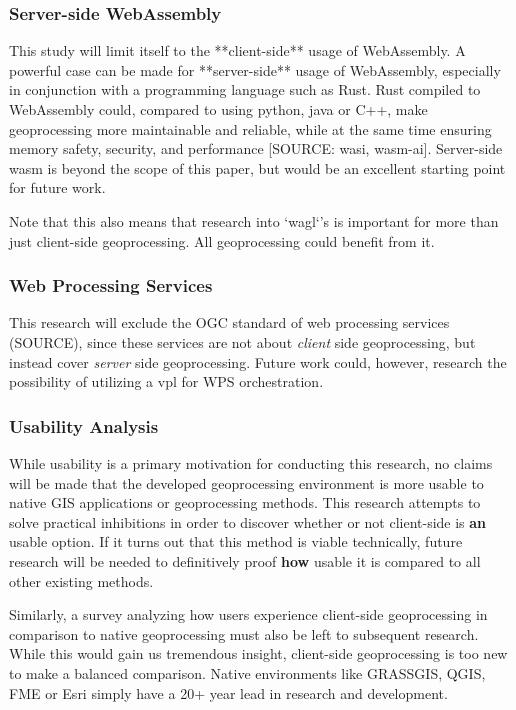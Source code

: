 \subsubsection*{Server-side WebAssembly} %

This study will limit itself to the **client-side** usage of WebAssembly. 
A powerful case can be made for **server-side** usage of WebAssembly, especially in conjunction with a programming language such as Rust. 
Rust compiled to WebAssembly could, compared to using python, java or C++, make geoprocessing more maintainable and reliable, while at the same time ensuring memory safety, security, and performance [SOURCE: wasi, wasm-ai]. 
Server-side wasm is beyond the scope of this paper, but would be an excellent starting point for future work. 

Note that this also means that research into `wagl`'s is important for more than just client-side geoprocessing. All geoprocessing could benefit from it.



\subsubsection*{Web Processing Services} %

This research will exclude the OGC standard of web processing services (SOURCE), since these services are not about \emph{client} side geoprocessing, but instead cover \emph{server} side geoprocessing. 
Future work could, however, research the possibility of utilizing a vpl for WPS orchestration. 



\subsubsection*{Usability Analysis} %

While usability is a primary motivation for conducting this research, no claims will be made that the developed geoprocessing environment is more usable to native GIS applications or geoprocessing methods. This research attempts to solve practical inhibitions in order to discover whether or not client-side is \textbf{an} usable option. If it turns out that this method is viable technically, future research will be needed to definitively proof \textbf{how} usable it is compared to all other existing methods.  


Similarly, a survey analyzing how users experience client-side geoprocessing in comparison to native geoprocessing must also be left to subsequent research. While this would gain us tremendous insight, client-side geoprocessing is too new to make a balanced comparison. Native environments like GRASSGIS, QGIS, FME or Esri simply have a 20+ year lead in research and development. 

